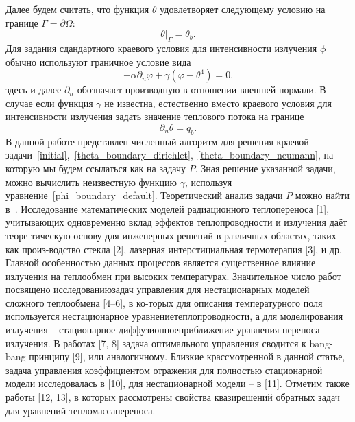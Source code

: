 \documentclass[10pt]{article}
\begin{document}
    Далее будем считать, что функция $\theta$ удовлетворяет следующему условию на границе
    $\Gamma = \partial \Omega$:
    \begin{equation}
        \label{theta_boundary_dirichlet}
        \theta|_\Gamma = \theta_b.
    \end{equation}
    Для задания сдандартного краевого условия для интенсивности излучения $\phi$ обычно
    используют граничное условие вида
    \begin{equation}
        \label{phi_boundary_default}
        - \alpha \partial_n \varphi + \gamma (\varphi - \theta ^4) = 0.
    \end{equation}
    здесь и далее $\partial_n$ обозначает производную в отношении внешней нормали.
    В случае если функция $\gamma$ не известна, естественно вместо краевого условия для
    интенсивности излучения задать значение теплового потока на границе
    \begin{equation}
        \label{theta_boundary_neumann}
        \partial_n \theta = q_b.
    \end{equation}
    В данной работе представлен численный алгоритм для решения краевой
    задачи~\eqref{initial},~\eqref{theta_boundary_dirichlet},~\eqref{theta_boundary_neumann},
    на которую мы будем ссылаться как на задачу $P$.
    Зная решение указанной задачи, можно вычислить
    неизвестную функцию $\gamma$, используя уравнение~\eqref{phi_boundary_default}.
    Теоретический анализ задачи $P$ можно найти в~\cite{cheb_same}.
    Исследование математических моделей радиационного теплопереноса [1], учитывающих одновременно
    вклад эффектов теплопроводности и излучения даёт теоре-тическую основу для инженерных решений
    в различных областях, таких как произ-водство стекла [2],
    лазерная интерстициальная термотерапия [3], и др.
    Главной особенностью данных процессов является существенное влияние излучения на теплообмен
    при высоких температурах.
    Значительное число работ посвящено исследованиюзадач управления для
    нестационарных моделей сложного теплообмена [4–6], в ко-торых для описания температурного поля
    используется нестационарное уравнениетеплопроводности, а для моделирования излучения --
    стационарное диффузионноеприближение уравнения переноса излучения.
    В работах [7, 8] задача оптимального управления сводится к
    bang-bang принципу [9], или аналогичному.
    Близкие крассмотренной в данной статье, задача управления коэффициентом отражения
    для полностью стационарной модели исследовалась в [10],
    для нестационарной модели – в [11].
    Отметим также работы [12, 13], в которых рассмотрены свойства квазирешений
    обратных задач для уравнений тепломассапереноса.
\end{document}
